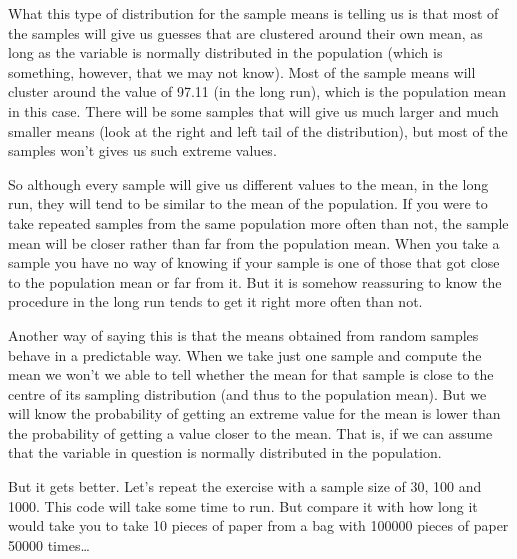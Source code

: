 \documentclass[
]{book}
\begin{document}
What this type of distribution for the sample means is telling us is that most of the samples will give us guesses that are clustered around their own mean, as long as the variable is normally distributed in the population (which is something, however, that we may not know). Most of the sample means will cluster around the value of 97.11 (in the long run), which is the population mean in this case. There will be some samples that will give us much larger and much smaller means (look at the right and left tail of the distribution), but most of the samples won't gives us such extreme values.

So although every sample will give us different values to the mean, in the long run, they will tend to be similar to the mean of the population. If you were to take repeated samples from the same population more often than not, the sample mean will be closer rather than far from the population mean. When you take a sample you have no way of knowing if your sample is one of those that got close to the population mean or far from it. But it is somehow reassuring to know the procedure in the long run tends to get it right more often than not.

Another way of saying this is that the means obtained from random samples behave in a predictable way. When we take just one sample and compute the mean we won't we able to tell whether the mean for that sample is close to the centre of its sampling distribution (and thus to the population mean). But we will know the probability of getting an extreme value for the mean is lower than the probability of getting a value closer to the mean. That is, if we can assume that the variable in question is normally distributed in the population.

But it gets better. Let's repeat the exercise with a sample size of 30, 100 and 1000. This code will take some time to run. But compare it with how long it would take you to take 10 pieces of paper from a bag with 100000 pieces of paper 50000 times\ldots{}
\end{document}
